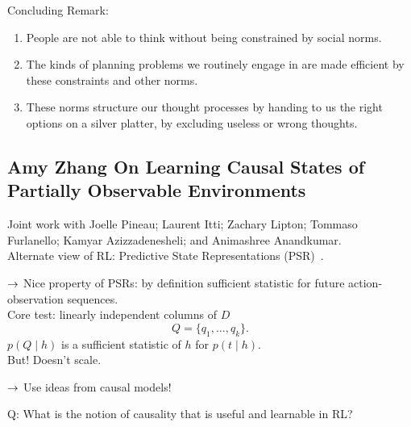 Concluding Remark:
\begin{enumerate}
    \item People are not able to think without being constrained by social norms.

    \item The kinds of planning problems we routinely engage in are made efficient by these constraints and other norms.

    \item These norms structure our thought processes by handing to us the right options on a silver platter, by excluding useless or wrong thoughts.
\end{enumerate}

\spacerule

\subsection{Amy Zhang On Learning Causal States of Partially Observable Environments}

Joint work with Joelle Pineau; Laurent Itti; Zachary Lipton; Tommaso Furlanello; Kamyar Azizzadenesheli; and Animashree Anandkumar. \\

Alternate view of RL: Predictive State Representations (PSR)~\cite{littman2002predictive}. \\


$\rightarrow$ Nice property of PSRs: by definition sufficient statistic for future action-observation sequences. \\

Core test: linearly independent columns of $D$
\[
Q = \{q_1, \ldots, q_k\}.
\]
$p(Q \mid h)$ is a sufficient statistic of $h$ for $p(t \mid h)$. \\

But! Doesn't scale. \\


$\rightarrow$ Use ideas from causal models!


Q: What is the notion of causality that is useful and learnable in RL? \\

